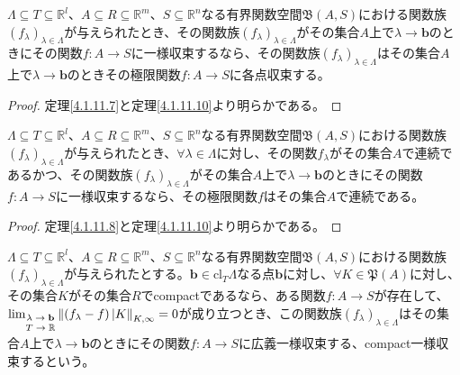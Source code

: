 \documentclass[dvipdfmx]{jsarticle}
\begin{document}
\begin{thm}\label{4.1.11.11}
$\varLambda \subseteq T \subseteq \mathbb{R}^{l}$、$A \subseteq R \subseteq \mathbb{R}^{m}$、$S \subseteq \mathbb{R}^{n}$なる有界関数空間$\mathfrak{B}(A,S)$における関数族$\left( f_{\lambda} \right)_{\lambda \in \varLambda}$が与えられたとき、その関数族$\left( f_{\lambda} \right)_{\lambda \in \varLambda}$がその集合$A$上で$\lambda \rightarrow \mathbf{b}$のときにその関数$f:A \rightarrow S$に一様収束するなら、その関数族$\left( f_{\lambda} \right)_{\lambda \in \varLambda}$はその集合$A$上で$\lambda \rightarrow \mathbf{b}$のときその極限関数$f:A \rightarrow S$に各点収束する。
\end{thm}
\begin{proof} 定理\ref{4.1.11.7}と定理\ref{4.1.11.10}より明らかである。
\end{proof}
\begin{thm}\label{4.1.11.12}
$\varLambda \subseteq T \subseteq \mathbb{R}^{l}$、$A \subseteq R \subseteq \mathbb{R}^{m}$、$S \subseteq \mathbb{R}^{n}$なる有界関数空間$\mathfrak{B}(A,S)$における関数族$\left( f_{\lambda} \right)_{\lambda \in \varLambda}$が与えられたとき、$\forall\lambda \in \varLambda$に対し、その関数$f_{\lambda}$がその集合$A$で連続であるかつ、その関数族$\left( f_{\lambda} \right)_{\lambda \in \varLambda}$がその集合$A$上で$\lambda \rightarrow \mathbf{b}$のときにその関数$f:A \rightarrow S$に一様収束するなら、その極限関数$f$はその集合$A$で連続である。
\end{thm}
\begin{proof} 定理\ref{4.1.11.8}と定理\ref{4.1.11.10}より明らかである。
\end{proof}
\begin{dfn}
$\varLambda \subseteq T \subseteq \mathbb{R}^{l}$、$A \subseteq R \subseteq \mathbb{R}^{m}$、$S \subseteq \mathbb{R}^{n}$なる有界関数空間$\mathfrak{B}(A,S)$における関数族$\left( f_{\lambda} \right)_{\lambda \in \varLambda}$が与えられたとする。$\mathbf{b} \in \mathrm{cl}_{T}\varLambda$なる点$\mathbf{b}$に対し、$\forall K \in \mathfrak{P}(A)$に対し、その集合$K$がその集合$R$でcompactであるなら、ある関数$f:A \rightarrow S$が存在して、$\lim_{\scriptsize \begin{matrix} \lambda \rightarrow \mathbf{b} \\ T \rightarrow \mathbb{R} \end{matrix}}\left\| \left( f_{\lambda} - f \right)|K \right\|_{K,\infty} = 0$が成り立つとき、この関数族$\left( f_{\lambda} \right)_{\lambda \in \varLambda}$はその集合$A$上で$\lambda \rightarrow \mathbf{b}$のときにその関数$f:A \rightarrow S$に広義一様収束する、compact一様収束するという。
\end{dfn}
\end{document}
